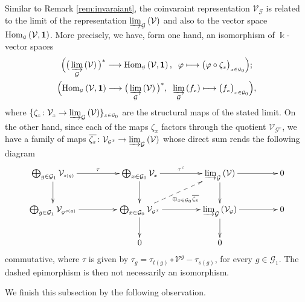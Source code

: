 \documentclass[pdftex]{sigma}
\numberwithin{equation}{section}
\renewcommand{\hom}[3]{\mathrm{Hom}_{\Sscript{#1}}\left(#2, #3\right)}
\newcommand{\bara}[1]{\overline{#1}}
\newcommand{\Go}{\cG_{\Sscript{0}}}
\newcommand{\Ga}{\cG_{\Sscript{1}}}
\newcommand{\cG}{{\mathcal G}}
\newcommand{\cV}{{\mathcal V}}
\newcommand{\Sscript}[1]{\scriptscriptstyle{#1}}
\newcommand{\injlimit}[2]{\varinjlim_{#1}\left({#2}\right)}
\begin{document}
\begin{Remark}\label{rem:coinv}Similar to Remark \ref{rem:invaraiant}, the coinvaraint representation $\cV_{\Sscript{\cG}}$ is related to the limit of the representation $\injlimit{\cG}{\cV}$ and also to the vector space
$\hom{\cG}{\cV}{\bf 1}$. More precisely, we have, form one hand, an isomorphism of $\Bbbk$-vector spaces
\begin{gather*}
\Big(\big(\injlimit{\cG}{\cV} \big)^* \longrightarrow
\hom{\cG}{\cV}{\bf 1}, \;\; \varphi \longmapsto \big( \varphi \circ
\zeta_{\Sscript{x}}\big)_{\Sscript{x \in \Go}} \Big); \\ \Big(
\hom{\cG}{\cV}{\bf 1} \longrightarrow \big(\injlimit{\cG}{\cV}
\big)^*,\;\;\injlimit{\cG}{f_{\Sscript{x}}} \longmapsto \big(
f_{\Sscript{x}}\big)_{\Sscript{x \in \Go}}\Big),
\end{gather*}
where $\{\zeta_{\Sscript{x}}\colon \cV_{\Sscript{x}} \to \injlimit{\cG}{\cV}\}_{\Sscript{x \in \Go}}$ are the structural maps of the stated limit. On the other hand, since each of the maps $\zeta_{\Sscript{x}}$ factors through the quotient $\cV_{\Sscript{\cG^x}}$, we have a family of maps $\bara{\zeta_{\Sscript{x}}}\colon \cV_{\Sscript{\cG^x}} \to \injlimit{\cG}{\cV}$ whose direct sum rends the following diagram
\begin{gather*}
\xymatrix@C=45pt{ \bigoplus_{g \in \Ga} \cV_{\Sscript{s(g)}}
\ar@{->}^-{\tau}[r] \ar@{->}^-{}[d] & \bigoplus_{x \in \Go}
\cV_{\Sscript{x}} \ar@{->}^-{\tau^{\Sscript{c}}}[r] \ar@{->}^-{}[d]
& \injlimit{\cG}{\cV} \ar@{->}^-{}[r] \ar@{->}^-{}[d] & 0 \\
\bigoplus_{g \in \Ga} \cV_{\Sscript{\cG^{s(g)}}}
\ar@{->}^-{}[r] & \bigoplus_{x \in \Go} \cV_{\Sscript{\cG^x}}
\ar@{->}^-{}[d] \ar@{-->}_-{\oplus_{\Sscript{x \in
\Go}}\bara{\zeta_{\Sscript{x}}} }[ru] \ar@{->}^-{}[r] &
\injlimit{\cG}{\cV_{\Sscript{\cG}}} \ar@{->}^-{}[d] \ar@{->}^-{}[r]
& 0 \\ & 0 & 0 & }
\end{gather*}
commutative, where $\tau$ is given by $\tau_{\Sscript{g}}=
\tau_{\Sscript{t(g)}} \circ \cV^{\Sscript{g}}-
\tau_{\Sscript{s(g)}}$, for every $g \in \Ga$. The dashed
epimorphism is then not necessarily an isomorphism.
\end{Remark}


We finish this subsection by the following observation.
\end{document}
